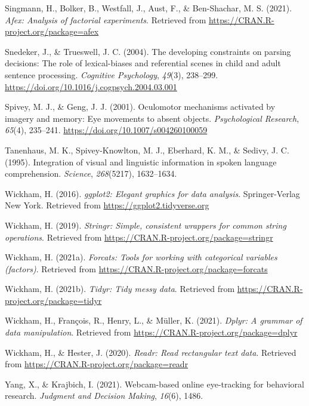 \documentclass[
  man,floatsintext]{apa6}
\newlength{\cslhangindent}
\newlength{\cslentryspacingunit} %
\newenvironment{CSLReferences}[2] %
 {%
  \setlength{\parindent}{0pt}
  \ifodd #1
  \let\oldpar\par
  \def\par{\hangindent=\cslhangindent\oldpar}
  \fi
  \setlength{\parskip}{#2\cslentryspacingunit}
 }%
 {}
\begin{document}
\begin{CSLReferences}{1}{0}
\leavevmode{}%
Singmann, H., Bolker, B., Westfall, J., Aust, F., \& Ben-Shachar, M. S. (2021). \emph{Afex: Analysis of factorial experiments}. Retrieved from \url{https://CRAN.R-project.org/package=afex}

\leavevmode{}%
Snedeker, J., \& Trueswell, J. C. (2004). The developing constraints on parsing decisions: {The} role of lexical-biases and referential scenes in child and adult sentence processing. \emph{Cognitive Psychology}, \emph{49}(3), 238--299. \url{https://doi.org/10.1016/j.cogpsych.2004.03.001}

\leavevmode{}%
Spivey, M. J., \& Geng, J. J. (2001). Oculomotor mechanisms activated by imagery and memory: Eye movements to absent objects. \emph{Psychological Research}, \emph{65}(4), 235--241. \url{https://doi.org/10.1007/s004260100059}

\leavevmode{}%
Tanenhaus, M. K., Spivey-Knowlton, M. J., Eberhard, K. M., \& Sedivy, J. C. (1995). Integration of visual and linguistic information in spoken language comprehension. \emph{Science}, \emph{268}(5217), 1632--1634.

\leavevmode{}%
Wickham, H. (2016). \emph{ggplot2: Elegant graphics for data analysis}. Springer-Verlag New York. Retrieved from \url{https://ggplot2.tidyverse.org}

\leavevmode{}%
Wickham, H. (2019). \emph{Stringr: Simple, consistent wrappers for common string operations}. Retrieved from \url{https://CRAN.R-project.org/package=stringr}

\leavevmode{}%
Wickham, H. (2021a). \emph{Forcats: Tools for working with categorical variables (factors)}. Retrieved from \url{https://CRAN.R-project.org/package=forcats}

\leavevmode{}%
Wickham, H. (2021b). \emph{Tidyr: Tidy messy data}. Retrieved from \url{https://CRAN.R-project.org/package=tidyr}

\leavevmode{}%
Wickham, H., François, R., Henry, L., \& Müller, K. (2021). \emph{Dplyr: A grammar of data manipulation}. Retrieved from \url{https://CRAN.R-project.org/package=dplyr}

\leavevmode{}%
Wickham, H., \& Hester, J. (2020). \emph{Readr: Read rectangular text data}. Retrieved from \url{https://CRAN.R-project.org/package=readr}

\leavevmode{}%
Yang, X., \& Krajbich, I. (2021). Webcam-based online eye-tracking for behavioral research. \emph{Judgment and Decision Making}, \emph{16}(6), 1486.

\end{CSLReferences}

\endgroup
\end{document}
